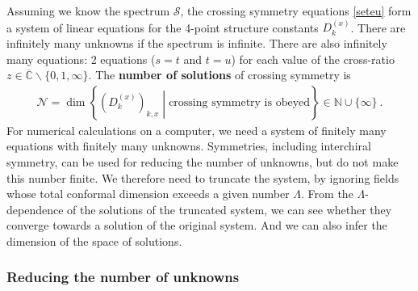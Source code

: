\documentclass[12pt, a4paper]{article}
\newcommand{\myindex}[1]{\textbf{\boldmath #1}}
\begin{document}
Assuming we know the spectrum $\mathcal{S}$, the 
crossing symmetry equations \eqref{seteu} form a system of linear equations for the 4-point structure constants $D^{(x)}_k$. There are infinitely many unknowns if the spectrum is infinite. There are also infinitely many equations: 2 equations ($s=t$ and $t=u$) for each value of the cross-ratio $z\in \overline{\mathbb{C}}\backslash\{0,1,\infty\}$. The \myindex{number of solutions} of crossing symmetry is
\begin{align}
 \mathcal{N} = \dim\left\{\left(D^{(x)}_k\right)_{k,x}\middle|\text{crossing symmetry is obeyed}\right\}\in \mathbb{N}\cup \{\infty\}\ . 
 \label{nsol}
\end{align}
For numerical calculations on a computer, we need a system of finitely many equations with finitely many unknowns. Symmetries, including interchiral symmetry, can be used for reducing the number of unknowns, but do not make this number finite. We therefore need to truncate the system, by ignoring fields whose total conformal dimension exceeds a given number $\Lambda$. From the $\Lambda$-dependence of the solutions of the truncated system, we can see whether they converge towards a solution of the original system. And we can also infer the dimension of the space of solutions. 

\subsubsection{Reducing the number of unknowns}
\end{document}
